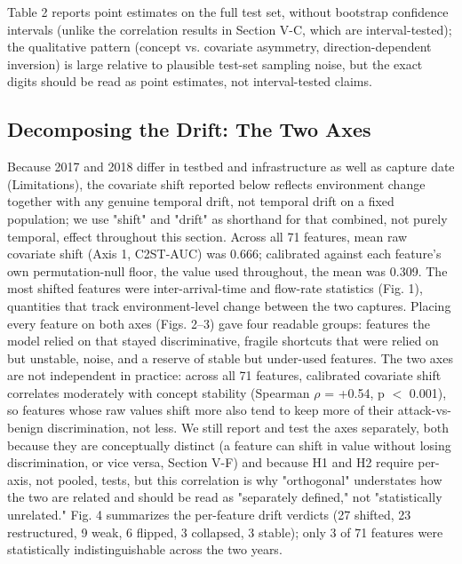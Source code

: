 \documentclass[conference]{IEEEtran}
\begin{document}
\footnotesize Table 2 reports point estimates on the full test set, without bootstrap confidence intervals (unlike the correlation results in Section V-C, which are interval-tested); the qualitative pattern (concept vs. covariate asymmetry, direction-dependent inversion) is large relative to plausible test-set sampling noise, but the exact digits should be read as point estimates, not interval-tested claims.\normalsize\par\medskip

\subsection{Decomposing the Drift: The Two Axes}

Because 2017 and 2018 differ in testbed and infrastructure as well as capture date (Limitations), the covariate shift reported below reflects environment change together with any genuine temporal drift, not temporal drift on a fixed population; we use "shift" and "drift" as shorthand for that combined, not purely temporal, effect throughout this section. Across all 71 features, mean raw covariate shift (Axis 1, C2ST-AUC) was 0.666; calibrated against each feature's own permutation-null floor, the value used throughout, the mean was 0.309. The most shifted features were inter-arrival-time and flow-rate statistics (Fig. 1), quantities that track environment-level change between the two captures. Placing every feature on both axes (Figs. 2--3) gave four readable groups: features the model relied on that stayed discriminative, fragile shortcuts that were relied on but unstable, noise, and a reserve of stable but under-used features. The two axes are not independent in practice: across all 71 features, calibrated covariate shift correlates moderately with concept stability (Spearman $\rho$ = +0.54, p $<$ 0.001), so features whose raw values shift more also tend to keep more of their attack-vs-benign discrimination, not less. We still report and test the axes separately, both because they are conceptually distinct (a feature can shift in value without losing discrimination, or vice versa, Section V-F) and because H1 and H2 require per-axis, not pooled, tests, but this correlation is why "orthogonal" understates how the two are related and should be read as "separately defined," not "statistically unrelated." Fig. 4 summarizes the per-feature drift verdicts (27 shifted, 23 restructured, 9 weak, 6 flipped, 3 collapsed, 3 stable); only 3 of 71 features were statistically indistinguishable across the two years.
\par\medskip
\end{document}
